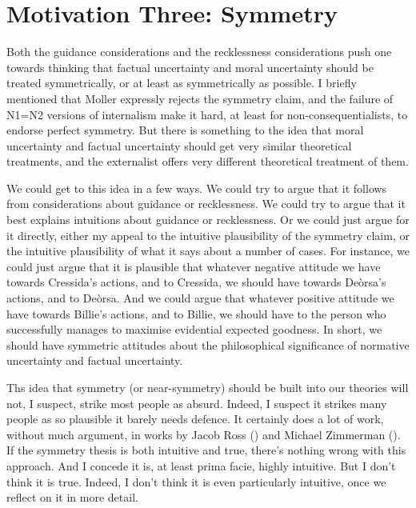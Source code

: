 \documentclass[
  10pt,
  letterpaper,
  twoside]{scrbook}
\begin{document}
\section{Motivation Three: Symmetry}\label{motivationthree:symmetry}

Both the guidance considerations and the recklessness considerations
push one towards thinking that factual uncertainty and moral uncertainty
should be treated symmetrically, or at least as symmetrically as
possible. I briefly mentioned that Moller expressly rejects the symmetry
claim, and the failure of N1=N2 versions of internalism make it hard, at
least for non-consequentialists, to endorse perfect symmetry. But there
is something to the idea that moral uncertainty and factual uncertainty
should get very similar theoretical treatments, and the externalist
offers very different theoretical treatment of them.

We could get to this idea in a few ways. We could try to argue that it
follows from considerations about guidance or recklessness. We could try
to argue that it best explains intuitions about guidance or
recklessness. Or we could just argue for it directly, either my appeal
to the intuitive plausibility of the symmetry claim, or the intuitive
plausibility of what it says about a number of cases. For instance, we
could just argue that it is plausible that whatever negative attitude we
have towards {Cressida}'s actions, and to {Cressida}, we should have
towards Deòrsa's actions, and to Deòrsa. And we could argue that
whatever positive attitude we have towards {Billie}'s actions, and to
{Billie}, we should have to the person who successfully manages to
maximise evidential expected goodness. In short, we should have
symmetric attitudes about the philosophical significance of normative
uncertainty and factual uncertainty.

Ths idea that symmetry (or near-symmetry) should be built into our
theories will not, I suspect, strike most people as absurd. Indeed, I
suspect it strikes many people as so plausible it barely needs defence.
It certainly does a lot of work, without much argument, in works by
Jacob Ross () and Michael Zimmerman
(). If the symmetry thesis is both
intuitive and true, there's nothing wrong with this approach. And I
concede it is, at least prima facie, highly intuitive. But I don't think
it is true. Indeed, I don't think it is even particularly intuitive,
once we reflect on it in more detail.
\end{document}
